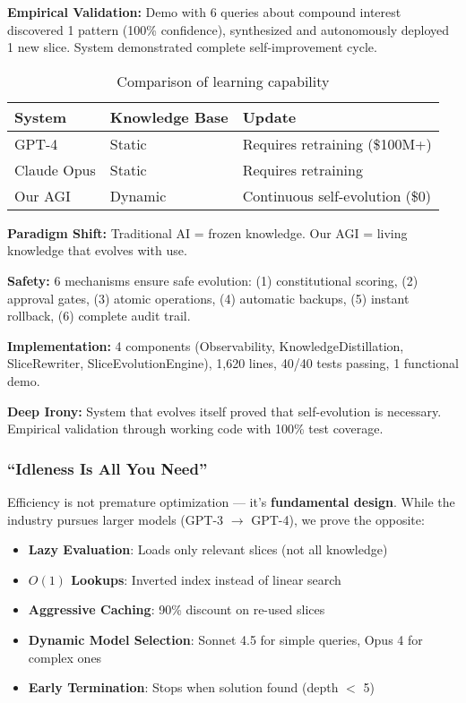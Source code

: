 \documentclass[11pt]{article}
\begin{document}
\textbf{Empirical Validation:} Demo with 6 queries about compound interest discovered 1 pattern (100\% confidence), synthesized and autonomously deployed 1 new slice. System demonstrated complete self-improvement cycle.

\begin{table}[H]
\centering
\begin{tabular}{@{}lll@{}}
\toprule
\textbf{System} & \textbf{Knowledge Base} & \textbf{Update} \\ \midrule
GPT-4 & Static & Requires retraining (\$100M+) \\
Claude Opus & Static & Requires retraining \\
Our AGI & Dynamic & Continuous self-evolution (\$0) \\ \bottomrule
\end{tabular}
\caption{Comparison of learning capability}
\end{table}

\textbf{Paradigm Shift:} Traditional AI = frozen knowledge. Our AGI = living knowledge that evolves with use.

\textbf{Safety:} 6 mechanisms ensure safe evolution: (1) constitutional scoring, (2) approval gates, (3) atomic operations, (4) automatic backups, (5) instant rollback, (6) complete audit trail.

\textbf{Implementation:} 4 components (Observability, KnowledgeDistillation, SliceRewriter, SliceEvolutionEngine), 1,620 lines, 40/40 tests passing, 1 functional demo.

\textbf{Deep Irony:} System that evolves itself proved that self-evolution is necessary. Empirical validation through working code with 100\% test coverage.

\subsubsection{``Idleness Is All You Need''}

Efficiency is not premature optimization --- it's \textbf{fundamental design}. While the industry pursues larger models (GPT-3 $\rightarrow$ GPT-4), we prove the opposite:

\begin{itemize}
    \item \textbf{Lazy Evaluation}: Loads only relevant slices (not all knowledge)
    \item \textbf{$O(1)$ Lookups}: Inverted index instead of linear search
    \item \textbf{Aggressive Caching}: 90\% discount on re-used slices
    \item \textbf{Dynamic Model Selection}: Sonnet 4.5 for simple queries, Opus 4 for complex ones
    \item \textbf{Early Termination}: Stops when solution found (depth $<$ 5)
\end{itemize}
\end{document}
